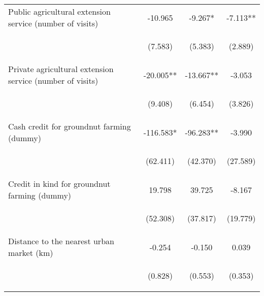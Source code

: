 \begin{center}
\begin{tabular}{lccc}
Public agricultural extension service (number of visits) & -10.965 & -9.267* & -7.113** \\
\vspace{4pt} & \begin{footnotesize}(7.583)\end{footnotesize} & \begin{footnotesize}(5.383)\end{footnotesize} & \begin{footnotesize}(2.889)\end{footnotesize} \\
Private agricultural extension service (number of visits) & -20.005** & -13.667** & -3.053 \\
\vspace{4pt} & \begin{footnotesize}(9.408)\end{footnotesize} & \begin{footnotesize}(6.454)\end{footnotesize} & \begin{footnotesize}(3.826)\end{footnotesize} \\
Cash credit for groundnut farming (dummy) & -116.583* & -96.283** & -3.990 \\
\vspace{4pt} & \begin{footnotesize}(62.411)\end{footnotesize} & \begin{footnotesize}(42.370)\end{footnotesize} & \begin{footnotesize}(27.589)\end{footnotesize} \\
Credit in kind for groundnut farming (dummy) & 19.798 & 39.725 & -8.167 \\
\vspace{4pt} & \begin{footnotesize}(52.308)\end{footnotesize} & \begin{footnotesize}(37.817)\end{footnotesize} & \begin{footnotesize}(19.779)\end{footnotesize} \\
Distance to the nearest urban market (km) & -0.254 & -0.150 & 0.039 \\
\vspace{4pt} & \begin{footnotesize}(0.828)\end{footnotesize} & \begin{footnotesize}(0.553)\end{footnotesize} & \begin{footnotesize}(0.353)\end{footnotesize} \\

\end{tabular}
\end{center}
